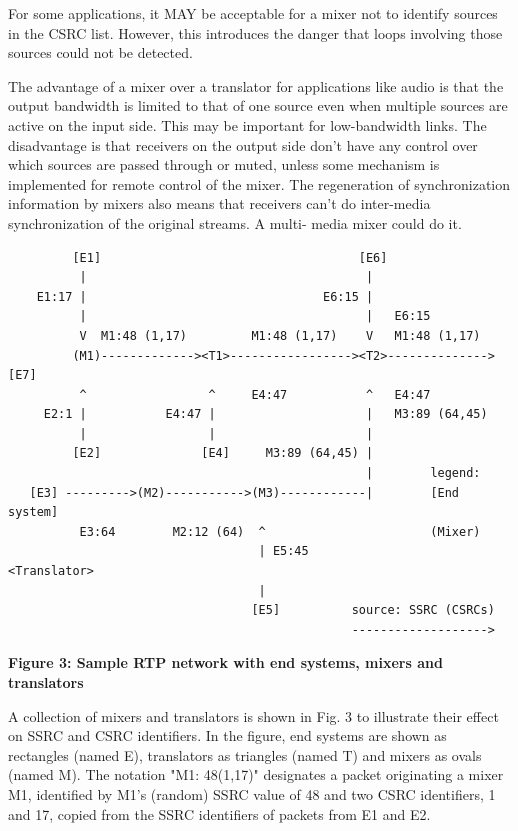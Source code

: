 \documentclass{article}
\begin{document}
\begin{itemize}
For some applications, it MAY be acceptable for a mixer not to identify sources in the CSRC list.  However, this introduces the danger that loops involving those sources could not be detected.

The advantage of a mixer over a translator for applications like audio is that the output bandwidth is limited to that of one source even when multiple sources are active on the input side.  This may be important for low-bandwidth links.  The disadvantage is that receivers on the output side don't have any control over which sources are passed through or muted, unless some mechanism is implemented for remote control of the mixer.  The regeneration of synchronization information by mixers also means that receivers can't do inter-media synchronization of the original streams.  A multi- media mixer could do it.

\end{itemize}
\begin{verbatim}
         [E1]                                    [E6]
          |                                       |
    E1:17 |                                 E6:15 |
          |                                       |   E6:15
          V  M1:48 (1,17)         M1:48 (1,17)    V   M1:48 (1,17)
         (M1)-------------><T1>-----------------><T2>-------------->[E7]
          ^                 ^     E4:47           ^   E4:47
     E2:1 |           E4:47 |                     |   M3:89 (64,45)
          |                 |                     |
         [E2]              [E4]     M3:89 (64,45) |
                                                  |        legend:
   [E3] --------->(M2)----------->(M3)------------|        [End system]
          E3:64        M2:12 (64)  ^                       (Mixer)
                                   | E5:45                 <Translator>
                                   |
                                  [E5]          source: SSRC (CSRCs)
                                                ------------------->

\end{verbatim}

\begin{center}
\textbf{Figure 3: Sample RTP network with end systems, mixers and translators}
\end{center}

A collection of mixers and translators is shown in Fig. 3 to illustrate their effect on SSRC and CSRC identifiers.  In the figure, end systems are shown as rectangles (named E), translators as triangles (named T) and mixers as ovals (named M).  The notation "M1: 48(1,17)" designates a packet originating a mixer M1, identified by M1's (random) SSRC value of 48 and two CSRC identifiers, 1 and 17, copied from the SSRC identifiers of packets from E1 and E2.
\end{document}
